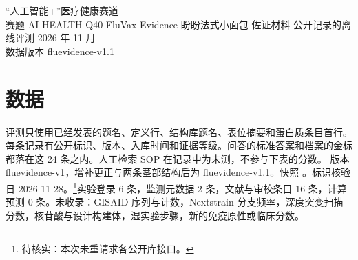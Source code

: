 

\contesttitlepage
  {“人工智能+”医疗健康赛道\\赛题 AI-HEALTH-Q40}
  {FluVax-Evidence}
  {盼盼法式小面包}
  {佐证材料}
  {公开记录的离线评测}
  {2026 年 11 月\\数据版本 fluevidence-v1.1}

\begin{abstract}
24 条公开记录。7 题 Recall@5 为 1.00，NDCG@5 为 0.929。四份档案与金标一致。已采纳语句与版本锁一致者为 59/59。
\end{abstract}

\section{数据}
评测只使用已经发表的题名、定义行、结构库题名、表位摘要和蛋白质条目首行。每条记录有公开标识、版本、入库时间和证据等级。问答的标准答案和档案的金标都落在这 24 条之内。人工检索 SOP 在记录中为未测，不参与下表的分数。
版本 fluevidence-v1，增补更正与两条茎部结构后为 fluevidence-v1.1。快照 。标识核验日 2026-11-28。\footnote{待核实：本次未重请求各公开库接口。}实验登录 6 条，监测元数据 2 条，文献与审校条目 16 条，计算预测 0 条。未收录：GISAID 序列与计数，Nextstrain 分支频率，深度突变扫描分数，核苷酸与设计构建体，湿实验步骤，新的免疫原性或临床分数。

